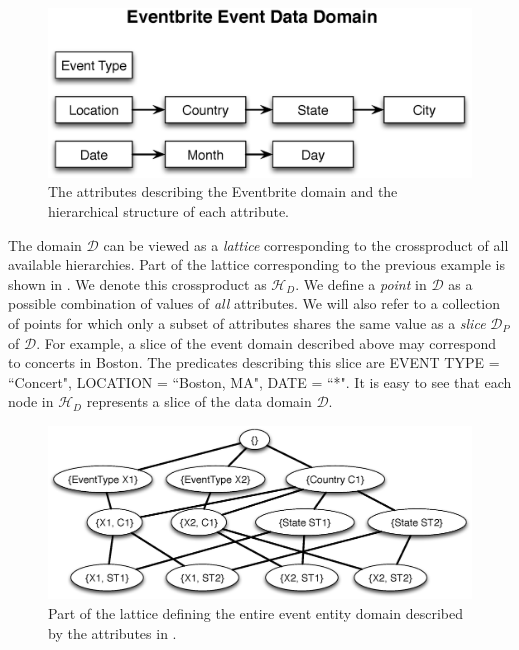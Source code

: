 \documentclass{vldb}
\newcommand{\domain}{\mathcal{D}}
\newcommand{\hierarchy}{\mathcal{H}_D}
\begin{document}
\begin{figure}[h]
	\begin{center}
	\includegraphics[clip,scale=0.4]{figs/eventsDomain.eps}
	\caption{The attributes describing the Eventbrite domain and the hierarchical structure of each attribute.}
	\label{fig:eventsdomain}
	\end{center}
	\vspace{-10pt}
\end{figure}

The domain $\domain$ can be viewed as a {\em lattice} corresponding to the crossproduct of all available hierarchies. Part of the lattice corresponding to the previous example is shown in . We denote this crossproduct as $\hierarchy$. We define a {\em point} in $\domain$ as a possible combination of values of {\em all} attributes. We will also refer to a collection of points for which only a subset of attributes shares the same value as a {\em slice} $\domain_P$ of $\domain$. For example, a slice of the event domain described above may correspond to concerts in Boston. The predicates describing this slice are EVENT TYPE = ``Concert", LOCATION = ``Boston, MA", DATE = ``*".  It is easy to see that each node in $\hierarchy$ represents a slice of the data domain $\domain$. 

\begin{figure}[h]
	\begin{center}
	\includegraphics[clip,scale=0.32]{figs/eventsExLattice.eps}
	\caption{Part of the lattice defining the entire event entity domain described by the attributes in .}
	\label{fig:eventslattice}
	\end{center}
	\vspace{-10pt}
\end{figure}
\end{document}
